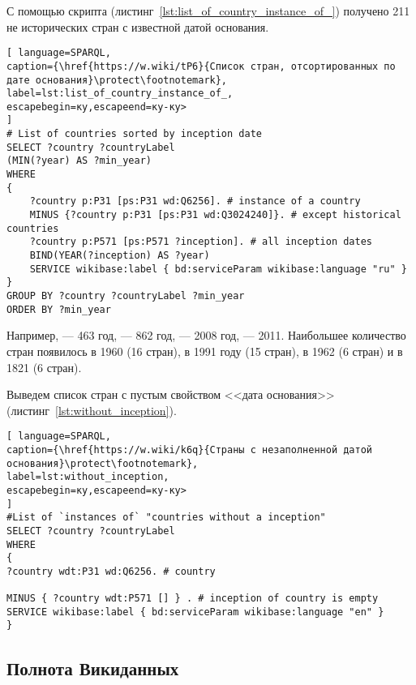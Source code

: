 С помощью скрипта (листинг~\ref{lst:list_of_country_instance_of_}) получено 211 не исторических стран с известной датой основания.

\begin{lstlisting}[ language=SPARQL, 
caption={\href{https://w.wiki/tP6}{Список стран, отсортированных по дате основания}\protect\footnotemark},
label=lst:list_of_country_instance_of_, 
escapebegin=ку,escapeend=ку-ку>
]
# List of countries sorted by inception date
SELECT ?country ?countryLabel 
(MIN(?year) AS ?min_year)
WHERE
{
	?country p:P31 [ps:P31 wd:Q6256]. # instance of a country 
	MINUS {?country p:P31 [ps:P31 wd:Q3024240]}. # except historical countries
	?country p:P571 [ps:P571 ?inception]. # all inception dates
	BIND(YEAR(?inception) AS ?year)
	SERVICE wikibase:label { bd:serviceParam wikibase:language "ru" }
}
GROUP BY ?country ?countryLabel ?min_year
ORDER BY ?min_year
\end{lstlisting}


Например,  --- 463 год,  --- 862 год,  --- 2008 год,  --- 2011. 
Наибольшее количество стран появилось в 1960 (16 стран), в 1991 году (15 стран), в 1962 (6 стран) и в 1821 (6 стран).

Выведем список стран с пустым свойством <<дата основания>> (листинг~\ref{lst:without_inception}).

\begin{lstlisting}[ language=SPARQL, 
caption={\href{https://w.wiki/k6q}{Страны с незаполненной датой основания}\protect\footnotemark},
label=lst:without_inception, 
escapebegin=ку,escapeend=ку-ку>
]
#List of `instances of` "countries without a inception" 
SELECT ?country ?countryLabel 
WHERE
{
?country wdt:P31 wd:Q6256. # country

MINUS { ?country wdt:P571 [] } . # inception of country is empty
SERVICE wikibase:label { bd:serviceParam wikibase:language "en" }
}
\end{lstlisting}


\subsection{Полнота Викиданных}

